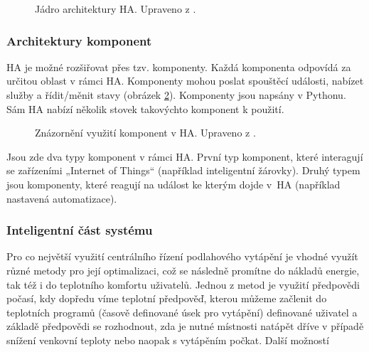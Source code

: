 \begin{figure}[H]
    \centering
    \def\svgwidth{\columnwidth}
    
    \caption{Jádro architektury HA. Upraveno z \cite{home-assistant-architektura}.}
    \label{fig:ha-jadro-architektury}
\end{figure}

\subsubsection{Architektury komponent}
HA je možné rozšiřovat přes tzv. komponenty. Každá komponenta odpovídá za určitou oblast v rámci HA. Komponenty mohou poslat spouštěcí události, nabízet služby a řídit/měnit stavy (obrázek \ref{fig:ha-architektura-komponent}). Komponenty jsou napsány v Pythonu. Sám HA nabízí několik stovek takovýchto komponent k použití.

\begin{figure}[H]
    \centering
    \def\svgwidth{\columnwidth}
    
    \caption{Znázornění využití komponent v HA. Upraveno z \cite{home-assistant-architektura}.}
    \label{fig:ha-architektura-komponent}
\end{figure}

Jsou zde dva typy komponent v rámci HA. První typ komponent, které interagují se zařízeními „Internet of Things“ (například inteligentní žárovky). Druhý typem jsou komponenty, které reagují na událost ke kterým dojde v~HA (například nastavená automatizace).


\subsubsection{Inteligentní část systému}
Pro co největší využití centrálního řízení podlahového vytápění je vhodné využít různé metody pro její optimalizaci, což se následně promítne do nákladů energie, tak též i do teplotního komfortu uživatelů. Jednou z metod je využití předpovědi počasí, kdy dopředu víme teplotní předpověď, kterou můžeme začlenit do teplotních programů (časově definované úsek pro vytápění) definované uživatel a základě  předpovědi se rozhodnout, zda je nutné místnosti natápět dříve v případě snížení venkovní teploty nebo naopak s vytápěním počkat. Další možností 

